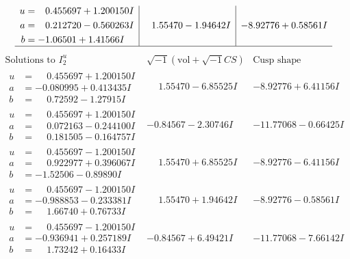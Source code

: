 \documentclass[1p]{elsarticle_modified}
\theoremstyle{definition}
\newcommand{\I}{\sqrt{-1}}
\begin{document}
$$\begin{array}{c|c|c}
\begin{aligned}
u &= \phantom{-}0.455697 + 1.200150 I \\
a &= \phantom{-}0.212720 - 0.560263 I \\
b &= -1.06501 + 1.41566 I\end{aligned}
 & \phantom{-}1.55470 - 1.94642 I & -8.92776 + 0.58561 I\\
 \hline 
 \end{array}$$\newpage$$\begin{array}{c|c|c}  
\text{Solutions to }I^u_{2}& \I (\text{vol} + \sqrt{-1}CS) & \text{Cusp shape}\\
 \hline 
\begin{aligned}
u &= \phantom{-}0.455697 + 1.200150 I \\
a &= -0.080995 + 0.413435 I \\
b &= \phantom{-}0.72592 - 1.27915 I\end{aligned}
 & \phantom{-}1.55470 - 6.85525 I & -8.92776 + 6.41156 I \\ \hline\begin{aligned}
u &= \phantom{-}0.455697 + 1.200150 I \\
a &= \phantom{-}0.072163 - 0.244100 I \\
b &= \phantom{-}0.181505 - 0.164757 I\end{aligned}
 & -0.84567 - 2.30746 I & -11.77068 - 0.66425 I \\ \hline\begin{aligned}
u &= \phantom{-}0.455697 - 1.200150 I \\
a &= \phantom{-}0.922977 + 0.396067 I \\
b &= -1.52506 - 0.89890 I\end{aligned}
 & \phantom{-}1.55470 + 6.85525 I & -8.92776 - 6.41156 I \\ \hline\begin{aligned}
u &= \phantom{-}0.455697 - 1.200150 I \\
a &= -0.988853 - 0.233381 I \\
b &= \phantom{-}1.66740 + 0.76733 I\end{aligned}
 & \phantom{-}1.55470 + 1.94642 I & -8.92776 - 0.58561 I \\ \hline\begin{aligned}
u &= \phantom{-}0.455697 - 1.200150 I \\
a &= -0.936941 + 0.257189 I \\
b &= \phantom{-}1.73242 + 0.16433 I\end{aligned}
 & -0.84567 + 6.49421 I & -11.77068 - 7.66142 I \\ \hline\begin{aligned}

\end{aligned}
\end{array}$$
\end{document}
